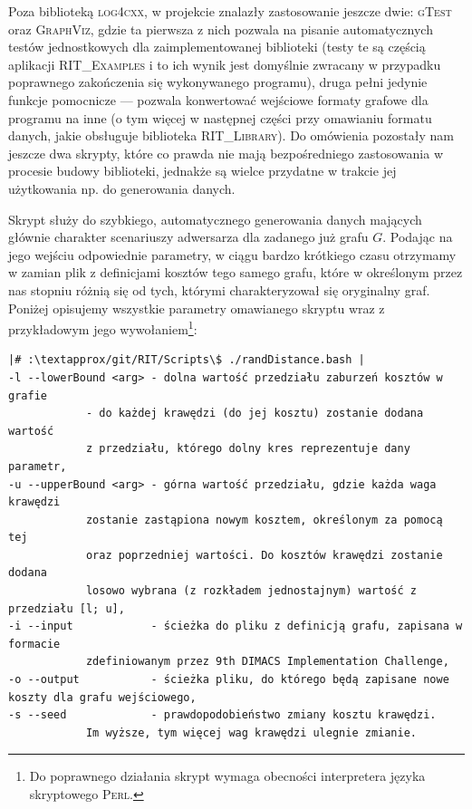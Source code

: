 Poza biblioteką \textsc{log4cxx}, w projekcie znalazły zastosowanie jeszcze dwie: \textsc{gTest} oraz \textsc{GraphViz}, gdzie ta pierwsza z nich pozwala na pisanie automatycznych testów jednostkowych dla zaimplementowanej biblioteki (testy te są częścią aplikacji \textsc{RIT\_Examples} i to ich wynik jest domyślnie zwracany w przypadku poprawnego zakończenia się wykonywanego programu), druga pełni jedynie funkcje pomocnicze --- pozwala konwertować wejściowe formaty grafowe dla programu na inne (o tym więcej w następnej części przy omawianiu formatu danych, jakie obsługuje biblioteka \textsc{RIT\_Library}). Do omówienia pozostały nam jeszcze dwa skrypty, które co prawda nie mają bezpośredniego zastosowania w procesie budowy biblioteki, jednakże są wielce przydatne w trakcie jej użytkowania np. do generowania danych.


Skrypt służy do szybkiego, automatycznego generowania danych mających głównie charakter scenariuszy adwersarza dla zadanego już grafu $G$. Podając na jego wejściu odpowiednie parametry, w ciągu bardzo krótkiego czasu otrzymamy w zamian plik z definicjami kosztów tego samego grafu, które w określonym przez nas stopniu różnią się od tych, którymi charakteryzował się oryginalny graf. Poniżej opisujemy wszystkie parametry omawianego skryptu wraz z przykładowym jego wywołaniem\footnote{Do poprawnego działania skrypt wymaga obecności interpretera języka skryptowego \textsc{Perl}.}:

\begin{verbatim}
|# :\textapprox/git/RIT/Scripts\$ ./randDistance.bash |
-l --lowerBound <arg> - dolna wartość przedziału zaburzeń kosztów w grafie 
			- do każdej krawędzi (do jej kosztu) zostanie dodana wartość 
			z przedziału, którego dolny kres reprezentuje dany parametr,
-u --upperBound <arg> - górna wartość przedziału, gdzie każda waga krawędzi
			zostanie zastąpiona nowym kosztem, określonym za pomocą tej 
			oraz poprzedniej wartości. Do kosztów krawędzi zostanie dodana 
			losowo wybrana (z rozkładem jednostajnym) wartość z przedziału [l; u],
-i --input            - ścieżka do pliku z definicją grafu, zapisana w formacie 
			zdefiniowanym przez 9th DIMACS Implementation Challenge,
-o --output           - ścieżka pliku, do którego będą zapisane nowe koszty dla grafu wejściowego,
-s --seed             - prawdopodobieństwo zmiany kosztu krawędzi. 
			Im wyższe, tym więcej wag krawędzi ulegnie zmianie.
\end{verbatim}

